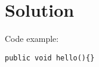 \documentclass[Main]{subfiles}
\begin{document}
\chapter{Solution}



















Code example:
\begin{lstlisting}[caption=Overskrift på boks, style=Code-C++, label=lst:referenceLabel]
public void hello(){}
\end{lstlisting}
\end{document}
